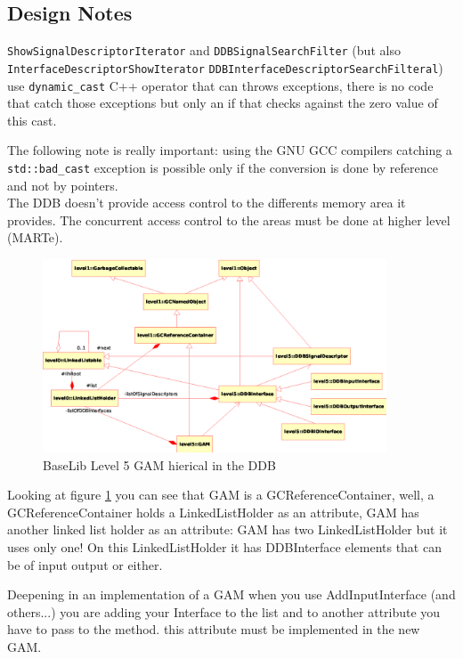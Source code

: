 \subsection{Design Notes}
\texttt{ShowSignalDescriptorIterator} and \texttt{DDBSignalSearchFilter} (but also
\texttt{InterfaceDescriptorShowIterator} \texttt{DDBInterfaceDescriptorSearchFilteral}) use \texttt{dynamic\_cast} C++ operator that can throws exceptions, there is no code that catch those exceptions but only an if that checks against the zero value of this cast.

The following note is really important: using the GNU GCC compilers catching a \texttt{std::bad\_cast} exception is possible only if the conversion is done by reference and not by pointers. \\


The DDB doesn't provide access control to the differents memory area it provides. The concurrent access control to the areas must be done at higher level (MARTe). \\

\begin{figure}[h!]
 \begin{center}
  \includegraphics[width=0.91\textwidth]{level5/GAM.eps}
  \caption{BaseLib Level 5 GAM hierical in the DDB}
  \label{f:level5:GAM_GCReferenceContainer}
 \end{center}
\end{figure}

Looking at figure \ref{f:level5:GAM_GCReferenceContainer} you can see that GAM is a GCReferenceContainer, well, a GCReferenceContainer holds a LinkedListHolder as an attribute, GAM has another linked list holder as an attribute: GAM has two LinkedListHolder but it uses only one! On this LinkedListHolder it has DDBInterface elements that can be of input output or either.

Deepening in an implementation of a GAM when you use AddInputInterface (and others...) you are adding your Interface to the list and to another attribute you have to pass to the method. this attribute must be implemented in the new GAM.

